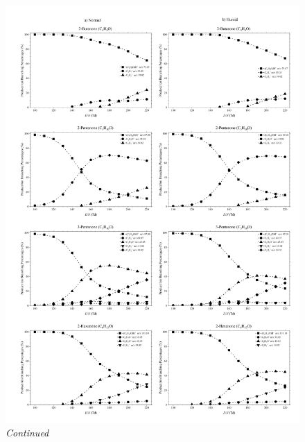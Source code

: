\captionsetup{list=no} %
\begin{figure}%
\centering
\includegraphics[width=1\textwidth]{pics/ketones/plot_2.png}
\caption{\textit{Continued}}
\end{figure}
